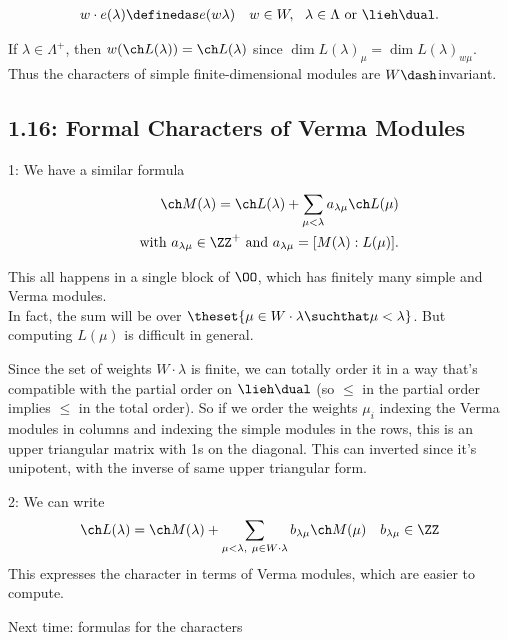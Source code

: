 \begin{align*}
w\cdot e(\lambda) \definedas e(w\lambda) \quad w\in W,~~\lambda \in \Lambda \text{ or } \lieh\dual
.\end{align*}

If \(\lambda \in \Lambda^+\), then
\(w( \ch L(\lambda) ) = \ch L(\lambda)\) since
\(\dim L(\lambda)_\mu = \dim L(\lambda)_{w\mu}\). Thus the characters of
simple finite-dimensional modules are \(W\dash\)invariant.

\hypertarget{formal-characters-of-verma-modules}{%
\subsection{1.16: Formal Characters of Verma
Modules}\label{formal-characters-of-verma-modules}}

1: We have a similar formula

\begin{align*}
\ch M(\lambda) = \ch L(\lambda) + \sum_{\mu < \lambda} a_{\lambda \mu} \ch L(\mu) \\
\quad \text{ with } a_{\lambda \mu} \in \ZZ^+ 
\text{ and } a_{\lambda \mu} = [M(\lambda): L(\mu)]
.\end{align*}

This all happens in a single block of \(\OO\), which has finitely many
simple and Verma modules.\\
In fact, the sum will be over
\(\theset{ \mu \in W\cdot \lambda \suchthat \mu < \lambda}\). But
computing \(L(\mu)\) is difficult in general.

Since the set of weights \(W\cdot \lambda\) is finite, we can totally
order it in a way that's compatible with the partial order on
\(\lieh\dual\) (so \(\leq\) in the partial order implies \(\leq\) in the
total order). So if we order the weights \(\mu_i\) indexing the Verma
modules in columns and indexing the simple modules in the rows, this is
an upper triangular matrix with 1s on the diagonal. This can inverted
since it's unipotent, with the inverse of same upper triangular form.

2: We can write
\begin{align*}
\ch L(\lambda) 
= \ch M(\lambda) + 
\sum_{\mu < \lambda,~\mu \in W\cdot \lambda} b_{\lambda \mu} \ch M(\mu) \quad b_{\lambda \mu} \in \ZZ
\end{align*} This expresses the character in terms of Verma modules,
which are easier to compute.

Next time: formulas for the characters

